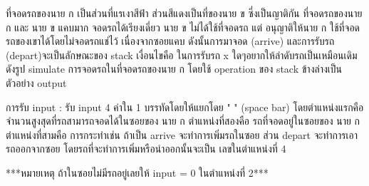 ที่จอดรถของนาย ก เป็นส่วนที่แรเงาสีฟ้า ส่วนสีแดงเป็นที่ของนาย ข ซี่งเป็นญาติกัน ที่จอดรถของนาย ก และ นาย ข แคบมาก จอดรถได้เรียงเดี่ยว นาย ข ไม่ได้ใช้ที่จอดรถ แต่ อนุญาติให้นาย ก ใช้ที่จอดรถของเขาได้โดยไม่จอดรถแช่ไว้ เนื่องจากซอยแคบ ดังนั้นการมาจอด (arrive) และการรับรถ (depart)จะเป็นลักษณะของ stack เงื่อนไขคือ ในการรับรถ x ใดๆอยากให้ลำดับรถเป็นเหมือนเดิม ดังรูป simulate การจอดรถในที่จอดรถของนาย ก โดยใช้ operation ของ stack ข้างล่างเป็นตัวอย่าง output

การรับ input : รับ input 4 ค่าใน 1 บรรทัดโดยให้แยกโดย " " (space bar) โดยตำแหน่งแรกคือ จำนวนสูงสุดที่รถสามารถจอดได้ในซอยของ นาย ก ตำแหน่งที่สองคือ รถที่จอดอยู่ในซอยของ นาย ก ตำแหน่งที่สามคือ การกระทำเช่น ถ้าเป็น arrive จะทำการเพิ่มรถในซอย ส่วน depart จะทำการเอารถออกจากซอย โดยรถที่จะทำการเพิ่มหรือนำออกนั้นจะเป็น เลขในตำแหน่งที่ 4

***หมายเหตุ ถ้าในซอยไม่มีรถอยู่เลยให้ input = 0 ในตำแหน่งที่ 2***